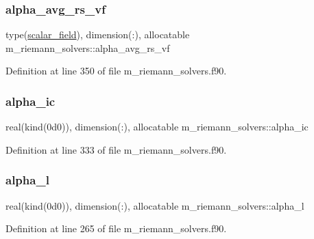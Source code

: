 \subsubsection{\texorpdfstring{alpha\+\_\+avg\+\_\+rs\+\_\+vf}{alpha\_avg\_rs\_vf}}
{\footnotesize\ttfamily type(\hyperlink{structm__derived__types_1_1scalar__field}{scalar\+\_\+field}), dimension(\+:), allocatable m\+\_\+riemann\+\_\+solvers\+::alpha\+\_\+avg\+\_\+rs\+\_\+vf}



Definition at line 350 of file m\+\_\+riemann\+\_\+solvers.\+f90.

\mbox{\label{namespacem__riemann__solvers_a0e605952054968421a3e444c8ba71063}} 
\subsubsection{\texorpdfstring{alpha\+\_\+ic}{alpha\_ic}}
{\footnotesize\ttfamily real(kind(0d0)), dimension(\+:), allocatable m\+\_\+riemann\+\_\+solvers\+::alpha\+\_\+ic}



Definition at line 333 of file m\+\_\+riemann\+\_\+solvers.\+f90.

\mbox{\label{namespacem__riemann__solvers_a485dc456f00eaa35c862ca3a2daa3d8c}} 
\subsubsection{\texorpdfstring{alpha\+\_\+l}{alpha\_l}}
{\footnotesize\ttfamily real(kind(0d0)), dimension(\+:), allocatable m\+\_\+riemann\+\_\+solvers\+::alpha\+\_\+l}



Definition at line 265 of file m\+\_\+riemann\+\_\+solvers.\+f90.

\mbox{\label{namespacem__riemann__solvers_abdd33525dd128beda2d0c33454e0d9de}} 
